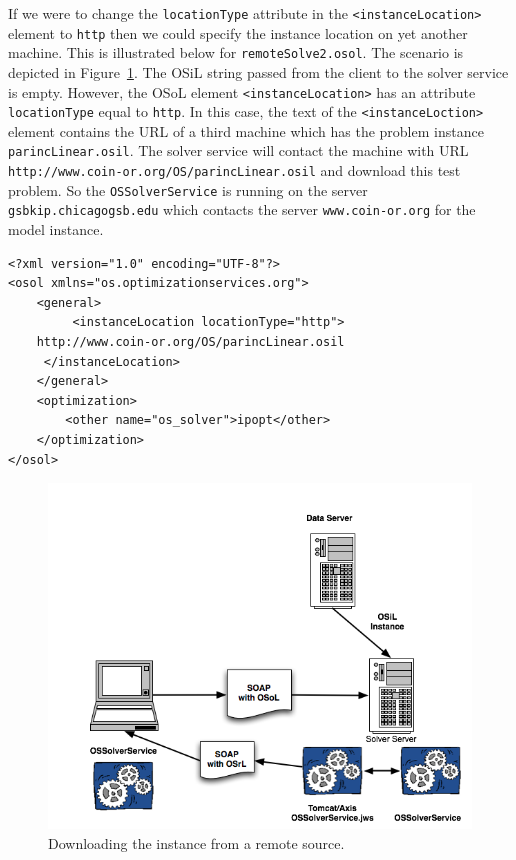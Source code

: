 \documentclass[11pt]{article}
\newcommand{\figurepath}{./figures}
\newcounter{Fig}
\renewcommand{\_}{{\char"5F}}
\renewcommand{\{}{{\char"7B}}
\renewcommand{\}}{{\char"7D}}
\renewcommand{\^}{{\char"0D}}
\renewcommand{\'}{{\char"0D}}
\begin{document}
\begin{enumerate}[Step 1:]
If we were to change the {\tt locationType} attribute in the {\tt <instanceLocation>} element to {\tt http} then we could specify the instance location on yet another machine. This is illustrated below  for {\tt remoteSolve2.osol}.  The scenario is depicted in Figure~\ref{figure:ossolverservice2}.  The OSiL string passed from the client to the solver service is empty.  However, the OSoL element {\tt <instanceLocation>}  has an attribute {\tt locationType} equal to   {\tt http}.  In this case, the text of the {\tt <instanceLoction>} element contains the URL of a third machine which has the problem instance {\tt parincLinear.osil}.  The solver service will contact the machine with URL {\tt http://www.coin-or.org/OS/parincLinear.osil} and download this test problem. So the {\tt OSSolverService} is running on the server {\tt gsbkip.chicagogsb.edu} which contacts the server {\tt www.coin-or.org} for the model instance.
\begin{verbatim}
<?xml version="1.0" encoding="UTF-8"?>
<osol xmlns="os.optimizationservices.org">
    <general>
         <instanceLocation locationType="http">
    http://www.coin-or.org/OS/parincLinear.osil
     </instanceLocation>
    </general>
    <optimization>
        <other name="os_solver">ipopt</other>
    </optimization>
</osol>
\end{verbatim}

\begin{figure}
\centering
\includegraphics[scale=0.5]{./figures/OSSolverService2.png}
\caption{Downloading the instance from a remote source.}
\label{figure:ossolverservice2}
\end{figure}


\end{enumerate}
\end{document}
